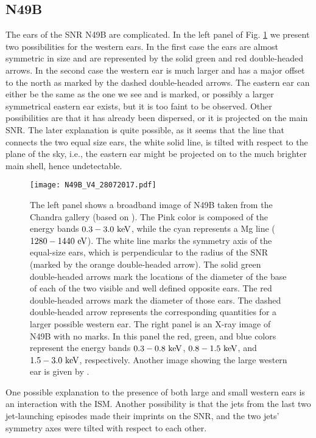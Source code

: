 \documentclass[12pt,preprint,a4paper]{aastex}
\def \eV{~\rm{eV}}
\def \keV{~\rm{keV}}
\begin{document}
\subsection{N49B}
\label{subsec:N49B}

The ears of the SNR N49B are complicated. In the left panel of Fig. \ref{N49B.eps} we present two possibilities for the western ears. In the first case the ears are almost symmetric in size and are represented by the solid green and red double-headed arrows. In the second case the western ear is much larger and has a major offset to the north as marked by the dashed double-headed arrows. The eastern ear can either be the same as the one we see and is marked, or possibly a larger symmetrical eastern ear exists, but it is too faint to be observed. Other possibilities are that it has already been dispersed, or it is projected on the main SNR. The later explanation is quite possible, as it seems that the line that connects the two equal size ears, the white solid line, is tilted with respect to the plane of the sky, i.e., the eastern ear might be projected on to the much brighter main shell, hence undetectable.
\begin{figure} %
\texttt{[image: N49B\_V4\_28072017.pdf]}\\
\centering
\caption{ The left panel shows a broadband image of N49B taken from the Chandra gallery (based on \citealt{Parketal2003}). The Pink color is composed of the energy bands $0.3-3.0 \keV$, while the cyan represents a Mg line ($1280 - 1440 \eV$). The white line marks the symmetry axis of the equal-size ears, which is perpendicular to the radius of the SNR (marked by the orange double-headed arrow). The solid green double-headed arrows mark the locations of the diameter of the base of each of the two visible and well defined opposite ears. The red double-headed arrows mark the diameter of those ears. The dashed double-headed arrow represents the corresponding quantities for a larger possible western ear. The right panel is an X-ray image of N49B with no marks. In this panel the red, green, and blue colors represent the energy bands $0.3-0.8 \keV$, $0.8-1.5 \keV$, and $1.5-3.0 \keV$, respectively. Another image showing the large western ear is given by \cite{Williamsetal2006}.    
} 
\label{N49B.eps}
\end{figure}

One possible explanation to the presence of both large and small western ears is an interaction with the ISM. Another possibility is that the jets from the last two jet-launching episodes made their imprints on the SNR, and the two jets' symmetry axes were tilted with respect to each other. 
 
\end{document}
